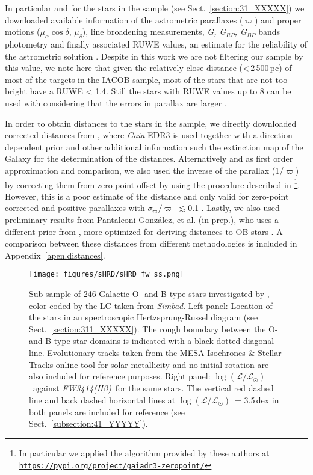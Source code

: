 \documentclass{aa}
\newcommand{\logLs}{$\log (\mathcal{L}/\mathcal{L}_{\odot})$}
\newcommand{\ls}{\mbox{$\lesssim$}}
\newcommand{\fwhb}{\textit{FW3414(H$\beta$)}}
\begin{document}
In particular and for the stars in the sample (see Sect.~\ref{section:31_XXXXX}) we downloaded available information of the astrometric parallaxes ($\varpi$) and proper motions ($\mu_{\alpha}\cos{\delta}$, $\mu_{\delta}$), line broadening measurements, \textit{G, G$_{RP}$, G$_{BP}$} bands photometry and finally associated RUWE values, an estimate for the reliability of the astrometric solution \citep{2021A&A...649A...2L}. Despite in this work we are not filtering our sample by this value, we note here that given the relatively close distance (<\,2\,500\,pc) of most of the targets in the IACOB sample, most of the stars that are not too bright have a RUWE < 1.4. Still the stars with RUWE values up to 8 can be used with considering that the errors in parallax are larger \citep[for more details see][]{2021A&A...649A..13M,2022A&A...657A.130M}. 

In order to obtain distances to the stars in the sample, we directly downloaded corrected distances from \citet{2021AJ....161..147B}, where {\em Gaia} EDR3 \citep{2021A&A...649A...1G} is used together with a direction-dependent prior and other additional information such the extinction map of the Galaxy for the determination of the distances. Alternatively and as first order approximation and comparison, we also used the inverse of the parallax (1/$\varpi$) by correcting them from zero-point offset by using the procedure described in \citet{2021A&A...649A...4L}\footnote{In particular we applied the algorithm provided by these authors at {\tt \url{https://pypi.org/project/gaiadr3-zeropoint/}}}. However, this is a poor estimate of the distance and only valid for zero-point corrected and positive parallaxes with $\sigma_{\varpi}/\varpi$ \ls 0.1 \citep[see][for more details]{2021AJ....161..147B}. Lastly, we also used preliminary results from Pantaleoni González, et al. (in prep.), who uses a different prior from \citet{2021AJ....161..147B}, more optimized for deriving distances to OB stars \citep[see][Sect.~3.3, for more details]{2021MNRAS.504.2968P}. A comparison between these distances from different methodologies is included in Appendix~\ref{apen.distances}.

\begin{figure*}[!t]
\centering
\texttt{[image: figures/sHRD/sHRD\_fw\_ss.png]}
\caption{Sub-sample of 246 Galactic O- and B-type stars investigated by \citet{2017A&A...597A..22S}, color-coded by the LC taken from \textit{Simbad}. Left panel: Location of the stars in an spectroscopic Hertzsprung-Russel diagram (see Sect.~\ref{section:311_XXXXX}). The rough boundary between the O- and B-type star domains is indicated with a black dotted diagonal line. Evolutionary tracks taken from the MESA Isochrones \& Stellar Tracks online tool for solar metallicity and no initial rotation are also included for reference purposes. Right panel: \logLs\ against \fwhb\ for the same stars. The vertical red dashed line and back dashed horizontal lines at \logLs\ = 3.5\,dex in both panels are included for reference (see Sect.~\ref{subsection:41_YYYYY}).}
\label{fig:shrd_fw_ss}
\end{figure*}
\end{document}
